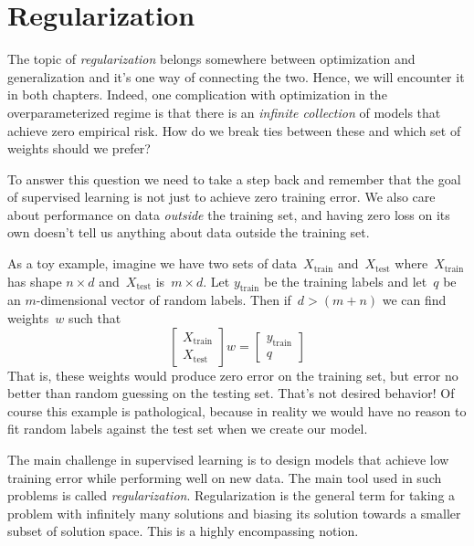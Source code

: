 \documentclass{tufte-book}
\begin{document}
\hypertarget{regularization}{%
\section{Regularization}\label{regularization}}


The topic of \emph{regularization} belongs somewhere between
optimization and generalization and it's one way of connecting the two.
Hence, we will encounter it in both chapters. Indeed, one complication
with optimization in the overparameterized regime is that there is an
\emph{infinite collection} of models that achieve zero empirical risk.
How do we break ties between these and which set of weights should we
prefer?

To answer this question we need to take a step back and remember that
the goal of supervised learning is not just to achieve zero training
error. We also care about performance on data \emph{outside} the
training set, and having zero loss on its own doesn't tell us anything
about data outside the training set.

As a toy example, imagine we have two sets of
data~\(X_{\mathrm{train}}\) and~\(X_{\mathrm{test}}\)
where~\(X_{\mathrm{train}}\) has shape \(n \times d\)
and~\(X_{\mathrm{test}}\) is~\(m \times d\). Let \(y_{\mathrm{train}}\)
be the training labels and let~\(q\) be an \(m\)-dimensional vector of
random labels. Then if~\(d>(m+n)\) we can find weights~\(w\) such that
\[
    \begin{bmatrix}
     X_{\mathrm{train}} \\ X_{\mathrm{test}}
    \end{bmatrix} w =
    \begin{bmatrix}
     y_{\mathrm{train}} \\ q
    \end{bmatrix}
\] That is, these weights would produce zero error on the training set,
but error no better than random guessing on the testing set. That's not
desired behavior! Of course this example is pathological, because in
reality we would have no reason to fit random labels against the test
set when we create our model.

The main challenge in supervised learning is to design models that
achieve low training error while performing well on new data. The main
tool used in such problems is called \emph{regularization}.
Regularization is the general term for taking a problem with infinitely
many solutions and biasing its solution towards a smaller subset of
solution space. This is a highly encompassing notion.
\end{document}
